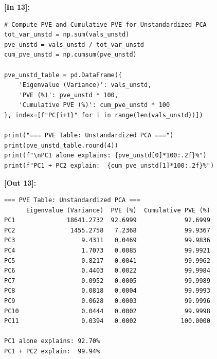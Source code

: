 \vspace{0.6em}
\noindent\textbf{\small [In 13]:}
\begin{lstlisting}[style=pycode]
# Compute PVE and Cumulative PVE for Unstandardized PCA
tot_var_unstd = np.sum(vals_unstd)
pve_unstd = vals_unstd / tot_var_unstd
cum_pve_unstd = np.cumsum(pve_unstd)

pve_unstd_table = pd.DataFrame({
    'Eigenvalue (Variance)': vals_unstd,
    'PVE (%)': pve_unstd * 100,
    'Cumulative PVE (%)': cum_pve_unstd * 100
}, index=[f"PC{i+1}" for i in range(len(vals_unstd))])

print("=== PVE Table: Unstandardized PCA ===")
print(pve_unstd_table.round(4))
print(f"\nPC1 alone explains: {pve_unstd[0]*100:.2f}%")
print(f"PC1 + PC2 explain:  {cum_pve_unstd[1]*100:.2f}%")
\end{lstlisting}
\noindent\textbf{\small [Out 13]:}
\begin{lstlisting}[style=output]
=== PVE Table: Unstandardized PCA ===
      Eigenvalue (Variance)  PVE (%)  Cumulative PVE (%)
PC1              18641.2732  92.6999             92.6999
PC2               1455.2758   7.2368             99.9367
PC3                  9.4311   0.0469             99.9836
PC4                  1.7073   0.0085             99.9921
PC5                  0.8217   0.0041             99.9962
PC6                  0.4403   0.0022             99.9984
PC7                  0.0952   0.0005             99.9989
PC8                  0.0818   0.0004             99.9993
PC9                  0.0628   0.0003             99.9996
PC10                 0.0444   0.0002             99.9998
PC11                 0.0394   0.0002            100.0000

PC1 alone explains: 92.70%
PC1 + PC2 explain:  99.94%
\end{lstlisting}

